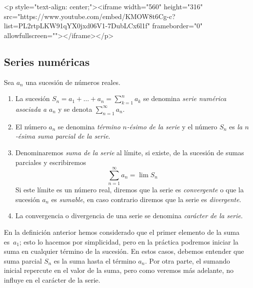 \begin{rawhtml}
<p style="text-align: center;"><iframe width="560" height="316" src="https://www.youtube.com/embed/KMOW8t6Cg-c?list=PL2rtpLKW91qYX0jxd06V1-7DubLCx6l1f" frameborder="0" allowfullscreen=""></iframe></p>
\end{rawhtml}

\subsection{Series numéricas}

\begin{definicion} Sea $a_n$ una sucesión de números reales.
\begin{enumerate}
\item
La sucesión $S_n=a_1+\dots +a_n =\displaystyle\sum_{k=1}^na_k$
se denomina \emph{serie numérica asociada a $a_n$} y se denota $\displaystyle\sum_{n=1}^\infty   a_n$.
\item
El número $a_n$ se denomina \emph{término $n$-ésimo de la serie} y el número
$S_n$ es \emph{la $n$-ésima suma parcial de la serie}.
\item
Denominaremos \emph{suma de la serie} al límite, si existe, de la sucesión de sumas parciales y escribiremos
\[
\displaystyle\sum_{n=1}^\infty   a_n=\lim S_n 
\]
Si este límite es un número real, diremos que la serie es \emph{convergente} o que la sucesión $a_n$ es \emph{sumable}, en caso contrario diremos que la serie es \emph{divergente}.
\enlargethispage{\baselineskip}
\item
La convergencia o divergencia de una serie se denomina \emph{carácter de la serie}.
\end{enumerate}
\end{definicion}


En la definición anterior hemos considerado que el primer elemento de la suma es~$a_1$; 
esto lo hacemos por simplicidad, pero en la práctica podremos iniciar la suma en cualquier término de la sucesión.
En estos casos, debemos entender que suma parcial $S_n$ es la suma hasta el término $a_n$.
Por otra parte, el sumando inicial repercute en el valor de la suma, pero como veremos más adelante, no influye en el carácter de la serie.


